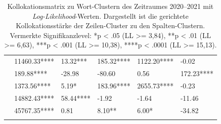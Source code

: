 \begin{table}
\caption{Kollokationsmatrix zu Wort-Clustern des Zeitraumes 2020--2021 mit \emph{Log-Likelihood}-Werten. Dargestellt ist die gerichtete Kollokationsstärke der Zeilen-Cluster zu den Spalten-Clustern. Vermerkte Signifikanzlevel: *p \textless{} .05 (LL \textgreater= 3,84), **p \textless{} .01 (LL \textgreater= 6,63), ***p \textless{} .001 (LL \textgreater= 10,38), ****p \textless{} .0001 (LL \textgreater= 15,13).}
\label{tab:collocation_matrix}
\begin{tabularx}{\textwidth}{X YYYYY}
  \lsptoprule
  &  &  &  &  &  \\
  \midrule
      & 11460.33**** & 13.32***  & 185.32**** & 1122.20**** & -0.02 \\
   & 189.88****   & -28.98    & -80.60     & 0.56        & 172.23**** \\
                                         & 1373.56****  & 5.19*     & 183.96**** & 2655.73**** & -0.23 \\
           & 14882.43**** & 58.44**** & -1.92      & -1.64       & -11.46 \\
      & 45767.35**** & 0.81      & 8.10**     & 6.00*       & -34.82 \\
  \lspbottomrule
 \end{tabularx}
\end{table}

